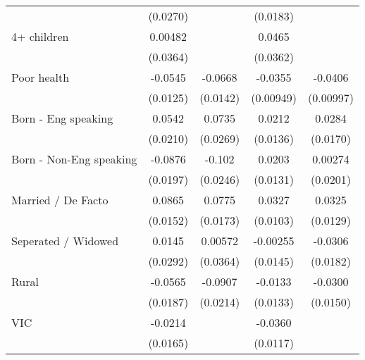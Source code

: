 {\begin{tabular}{l*{4}{c}}
                    &    (0.0270)         &                     &    (0.0183)         &                     \\
[1em]
4+ children         &     0.00482         &                     &      0.0465         &                     \\
                    &    (0.0364)         &                     &    (0.0362)         &                     \\
[1em]
Poor health         &     -0.0545\sym{***}&     -0.0668\sym{***}&     -0.0355\sym{***}&     -0.0406\sym{***}\\
                    &    (0.0125)         &    (0.0142)         &   (0.00949)         &   (0.00997)         \\
[1em]
Born - Eng speaking &      0.0542\sym{**} &      0.0735\sym{**} &      0.0212         &      0.0284         \\
                    &    (0.0210)         &    (0.0269)         &    (0.0136)         &    (0.0170)         \\
[1em]
Born - Non-Eng speaking&     -0.0876\sym{***}&      -0.102\sym{***}&      0.0203         &     0.00274         \\
                    &    (0.0197)         &    (0.0246)         &    (0.0131)         &    (0.0201)         \\
[1em]
Married / De Facto  &      0.0865\sym{***}&      0.0775\sym{***}&      0.0327\sym{**} &      0.0325\sym{*}  \\
                    &    (0.0152)         &    (0.0173)         &    (0.0103)         &    (0.0129)         \\
[1em]
Seperated / Widowed &      0.0145         &     0.00572         &    -0.00255         &     -0.0306         \\
                    &    (0.0292)         &    (0.0364)         &    (0.0145)         &    (0.0182)         \\
[1em]
Rural               &     -0.0565\sym{**} &     -0.0907\sym{***}&     -0.0133         &     -0.0300\sym{*}  \\
                    &    (0.0187)         &    (0.0214)         &    (0.0133)         &    (0.0150)         \\
[1em]
VIC                 &     -0.0214         &                     &     -0.0360\sym{**} &                     \\
                    &    (0.0165)         &                     &    (0.0117)         &                     \\

\end{tabular}}

